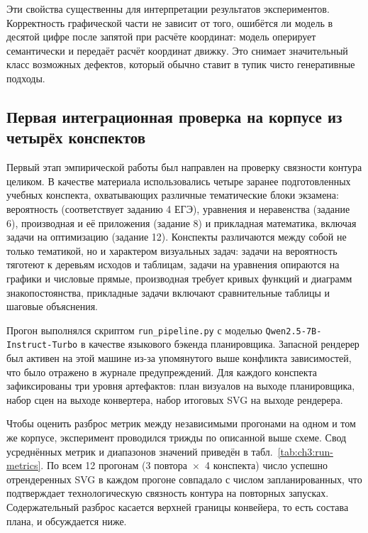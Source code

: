 Эти свойства существенны для интерпретации результатов экспериментов. Корректность графической части не зависит от того, ошибётся ли модель в десятой цифре после запятой при расчёте координат: модель оперирует семантически и передаёт расчёт координат движку. Это снимает значительный класс возможных дефектов, который обычно ставит в тупик чисто генеративные подходы.

\subsection{Первая интеграционная проверка на корпусе из четырёх конспектов}
\label{sec:ch3:integration}

Первый этап эмпирической работы был направлен на проверку связности контура целиком. В качестве материала использовались четыре заранее подготовленных учебных конспекта, охватывающих различные тематические блоки экзамена: вероятность (соответствует заданию 4 ЕГЭ), уравнения и неравенства (задание 6), производная и её приложения (задание 8) и прикладная математика, включая задачи на оптимизацию (задание 12). Конспекты различаются между собой не только тематикой, но и характером визуальных задач: задачи на вероятность тяготеют к деревьям исходов и таблицам, задачи на уравнения опираются на графики и числовые прямые, производная требует кривых функций и диаграмм знакопостоянства, прикладные задачи включают сравнительные таблицы и шаговые объяснения.

Прогон выполнялся скриптом \texttt{run\_pipeline.py} с моделью \texttt{Qwen2.5\nobreakdash-7B\nobreakdash-Instruct\nobreakdash-Turbo} в качестве языкового бэкенда планировщика. Запасной рендерер был активен на этой машине из\nobreakdash-за упомянутого выше конфликта зависимостей, что было отражено в журнале предупреждений. Для каждого конспекта зафиксированы три уровня артефактов: план визуалов на выходе планировщика, набор сцен на выходе конвертера, набор итоговых SVG на выходе рендерера.

Чтобы оценить разброс метрик между независимыми прогонами на одном и том же корпусе, эксперимент проводился трижды по описанной выше схеме. Свод усреднённых метрик и диапазонов значений приведён в табл.~\ref{tab:ch3:run-metrics}. По всем 12 прогонам (3 повтора~$\times$~4 конспекта) число успешно отрендеренных SVG в каждом прогоне совпадало с числом запланированных, что подтверждает технологическую связность контура на повторных запусках. Содержательный разброс касается верхней границы конвейера, то есть состава плана, и обсуждается ниже.

